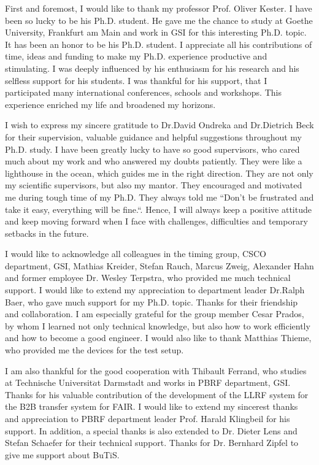 First and foremost, I would like to thank my professor Prof. Oliver Kester. I have been so lucky to be his Ph.D. student. He gave me the chance to study at Goethe University, Frankfurt am Main and work in GSI for this interesting Ph.D. topic. It has been an honor to be his Ph.D. student. I appreciate all his contributions of time, ideas and funding to make my Ph.D. experience productive and stimulating. I was deeply influenced by his enthusiasm for his research and his selfless support for his students. I was thankful for his support, that I participated many international conferences, schools and workshops. This experience enriched my life and  
broadened my horizons.

I wish to express my sincere gratitude to Dr.David Ondreka and Dr.Dietrich Beck for their supervision, valuable guidance and helpful suggestions throughout my Ph.D. study. I have been greatly lucky to have so good supervisors, who cared much about my work and who answered my doubts patiently. They were like a lighthouse in the ocean, which guides me in the right direction. They are not only my  scientific supervisors, but also my mantor. They encouraged and motivated me during tough time of my Ph.D. They always told me ``Don't be frustrated and take it easy, everything will be fine.``. Hence, I will always keep a positive attitude and keep moving forward when I face with challenges, difficulties and temporary setbacks in the future.

I would like to acknowledge all colleagues in the timing group, CSCO department, GSI, Mathias Kreider, Stefan Rauch, Marcus Zweig, Alexander Hahn and former employee Dr. Wesley Terpstra, who provided me much technical support. I would like to extend my appreciation to department leader Dr.Ralph Baer, who gave much support for my Ph.D. topic. Thanks for their friendship and collaboration. I am especially grateful for the group member Cesar Prados, by whom I learned not only technical knowledge, but also how to work efficiently and how to become a good engineer. I would also like to thank Matthias Thieme, who provided me the devices for the test setup.  

I am also thankful for the good cooperation with Thibault Ferrand, who studies at Technische Universit$\ddot{a}$t Darmstadt and works in PBRF department, GSI. Thanks for his valuable contribution of the development of the LLRF system for the B2B transfer system for FAIR. I would like to extend my sincerest thanks and appreciation to PBRF department leader Prof. Harald Klingbeil for his support. In addition, a special thanks is also extended to Dr. Dieter Lens and Stefan Schaefer for their technical support. Thanks for Dr. Bernhard Zipfel to give me support about BuTiS.

